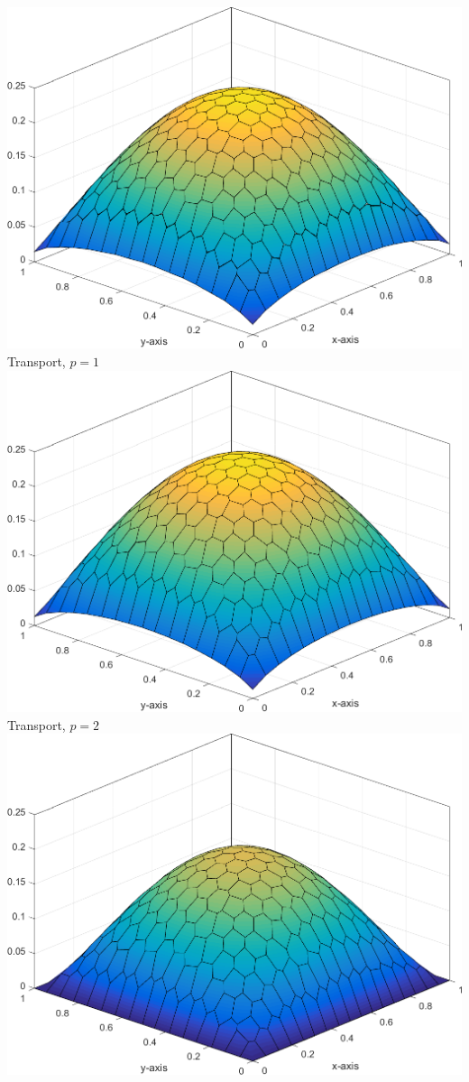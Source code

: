 \documentclass[compress,10pt]{beamer}
\begin{document}
\begin{frame}[t]
{\begin{columns}
\centering
{}\includegraphics[width=0.75\columnwidth]{images/Sq_poly_MAXENT_k=1_ep=1e-1.png}\\
Transport, $p=1$
{}\includegraphics[width=0.75\columnwidth]{images/Sq_poly_MAXENT_k=2_ep=1e-1.png}\\
Transport, $p=2$
\centering
{}\includegraphics[width=0.75\columnwidth]{images/Sq_poly_MAXENT_k=1.png}\\

\end{columns}}
\end{frame}
\end{document}
